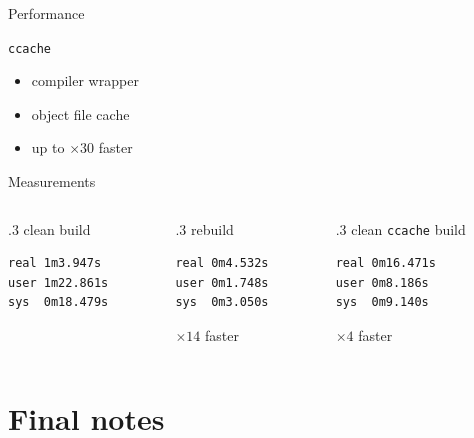 \documentclass[hyperref={colorlinks=false, breaklinks=true},11pt]{beamer}
\begin{document}
\begin{frame}[fragile]{Performance}
    \begin{block}{\texttt{ccache}}
        \begin{itemize}
            \item compiler wrapper
            \item object file cache
            \item up to $\times30$ faster
        \end{itemize}
    \end{block}

    \begin{block}{Measurements}
        \vspace{3mm}
        \begin{columns}[T]
            \begin{column}{.3\textwidth}
                clean build
\begin{verbatim}
real 1m3.947s
user 1m22.861s
sys  0m18.479s
\end{verbatim}
            \end{column}
            \begin{column}{.3\textwidth}
                rebuild
\begin{verbatim}
real 0m4.532s
user 0m1.748s
sys  0m3.050s
\end{verbatim}
$\times 14$ faster
            \end{column}
            \begin{column}{.3\textwidth}
                clean \texttt{ccache} build
\begin{verbatim}
real 0m16.471s
user 0m8.186s
sys  0m9.140s
\end{verbatim}
$\times 4$ faster
            \end{column}
        \end{columns}
    \end{block}
\end{frame}


\section{Final notes}
\end{document}
